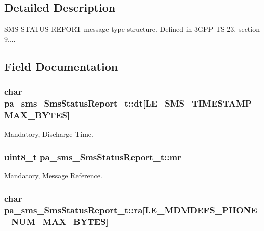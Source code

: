 \subsection{Detailed Description}
S\+MS S\+T\+A\+T\+US R\+E\+P\+O\+RT message type structure. Defined in 3\+G\+PP TS 23. section 9.... 

\subsection{Field Documentation}
\subsubsection[{\texorpdfstring{dt}{dt}}]{\setlength{\rightskip}{0pt plus 5cm}char pa\+\_\+sms\+\_\+\+Sms\+Status\+Report\+\_\+t\+::dt\mbox{[}{\bf L\+E\+\_\+\+S\+M\+S\+\_\+\+T\+I\+M\+E\+S\+T\+A\+M\+P\+\_\+\+M\+A\+X\+\_\+\+B\+Y\+T\+ES}\mbox{]}}\hypertarget{structpa__sms___sms_status_report__t_ae13099a8e30a37a1c3cb50ac168a87ed}{}\label{structpa__sms___sms_status_report__t_ae13099a8e30a37a1c3cb50ac168a87ed}


Mandatory, Discharge Time. 

\subsubsection[{\texorpdfstring{mr}{mr}}]{\setlength{\rightskip}{0pt plus 5cm}uint8\+\_\+t pa\+\_\+sms\+\_\+\+Sms\+Status\+Report\+\_\+t\+::mr}\hypertarget{structpa__sms___sms_status_report__t_a65f858c82eaed11ccb4eb50e9f4a50fb}{}\label{structpa__sms___sms_status_report__t_a65f858c82eaed11ccb4eb50e9f4a50fb}


Mandatory, Message Reference. 

\subsubsection[{\texorpdfstring{ra}{ra}}]{\setlength{\rightskip}{0pt plus 5cm}char pa\+\_\+sms\+\_\+\+Sms\+Status\+Report\+\_\+t\+::ra\mbox{[}{\bf L\+E\+\_\+\+M\+D\+M\+D\+E\+F\+S\+\_\+\+P\+H\+O\+N\+E\+\_\+\+N\+U\+M\+\_\+\+M\+A\+X\+\_\+\+B\+Y\+T\+ES}\mbox{]}}\hypertarget{structpa__sms___sms_status_report__t_af715a8d5325c7db3f3d124fc8b7f47a4}{}\label{structpa__sms___sms_status_report__t_af715a8d5325c7db3f3d124fc8b7f47a4}


